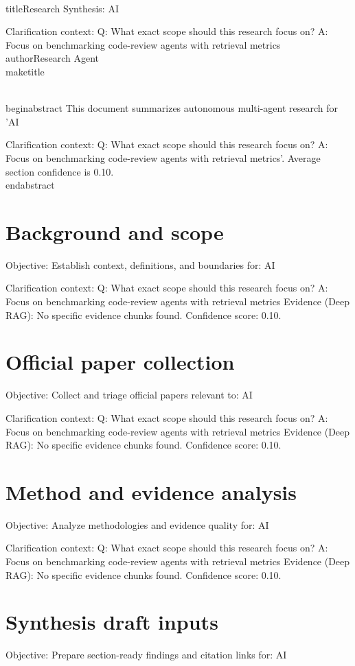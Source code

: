 \documentclass[conference]{IEEEtran}
\begin{document}
\\titleResearch Synthesis: AI

Clarification context:
Q: What exact scope should this research focus on?
A: Focus on benchmarking code-review agents with retrieval metrics
\\authorResearch Agent
\\maketitle

\\begin{abstract}
This document summarizes autonomous multi-agent research for 'AI

Clarification context:
Q: What exact scope should this research focus on?
A: Focus on benchmarking code-review agents with retrieval metrics'. Average section confidence is 0.10.
\\end{abstract}

\section{Background and scope}
Objective: Establish context, definitions, and boundaries for: AI

Clarification context:
Q: What exact scope should this research focus on?
A: Focus on benchmarking code-review agents with retrieval metrics
Evidence (Deep RAG):
No specific evidence chunks found.
Confidence score: 0.10.

\section{Official paper collection}
Objective: Collect and triage official papers relevant to: AI

Clarification context:
Q: What exact scope should this research focus on?
A: Focus on benchmarking code-review agents with retrieval metrics
Evidence (Deep RAG):
No specific evidence chunks found.
Confidence score: 0.10.

\section{Method and evidence analysis}
Objective: Analyze methodologies and evidence quality for: AI

Clarification context:
Q: What exact scope should this research focus on?
A: Focus on benchmarking code-review agents with retrieval metrics
Evidence (Deep RAG):
No specific evidence chunks found.
Confidence score: 0.10.

\section{Synthesis draft inputs}
Objective: Prepare section-ready findings and citation links for: AI
\end{document}
